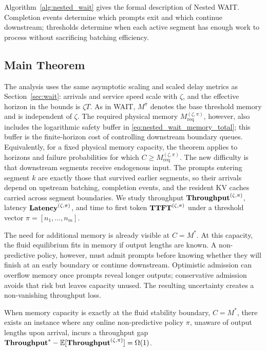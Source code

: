 Algorithm~\ref{alg:nested_wait} gives the formal description of Nested WAIT. Completion events determine which prompts exit and which continue downstream; thresholds determine when each active segment has enough work to process without sacrificing batching efficiency.

\subsection{Main Theorem}
\label{subsec:nested_main_theorem}

The analysis uses the same asymptotic scaling and scaled delay metrics as Section~\ref{sec:wait}: arrivals and service speed scale with \(\zeta\), and the effective horizon in the bounds is \(\zeta T\). As in WAIT, \(M^\pi\) denotes the base threshold memory and is independent of \(\zeta\). The required physical memory \(M_{\mathrm{req}}^{(\zeta,\pi)}\), however, also includes the logarithmic safety buffer in \eqref{eq:nested_wait_memory_total}; this buffer is the finite-horizon cost of controlling downstream boundary queues. Equivalently, for a fixed physical memory capacity, the theorem applies to horizons and failure probabilities for which \(C\ge M_{\mathrm{req}}^{(\zeta,\pi)}\). The new difficulty is that downstream segments receive endogenous input. The prompts entering segment \(k\) are exactly those that survived earlier segments, so their arrivals depend on upstream batching, completion events, and the resident KV caches carried across segment boundaries. We study throughput \(\textbf{Throughput}^{(\zeta,\pi)}\), latency \(\textbf{Latency}^{(\zeta,\pi)}\), and time to first token \(\textbf{TTFT}^{(\zeta,\pi)}\) under a threshold vector \(\pi=[n_1,\dots,n_m]\).

The need for additional memory is already visible at \(C=M^*\). At this capacity, the fluid equilibrium fits in memory if output lengths are known. A non-predictive policy, however, must admit prompts before knowing whether they will finish at an early boundary or continue downstream. Optimistic admission can overflow memory once prompts reveal longer outputs; conservative admission avoids that risk but leaves capacity unused. The resulting uncertainty creates a non-vanishing throughput loss.

\begin{proposition}
\label{prop:unknown_lower_bound}
When memory capacity is exactly at the fluid stability boundary, \(C=M^*\), there exists an instance where any online non-predictive policy \( \pi \), unaware of output lengths upon arrival, incurs a throughput gap \( \textbf{Throughput}^* - \mathbb{E}[\textbf{Throughput}^{(\zeta, \pi)}] = \Omega(1) \).
\end{proposition}

